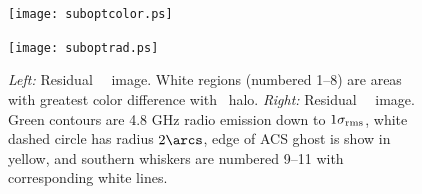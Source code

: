 \begin{figure}
  \begin{center}
    \begin{minipage}{0.495\linewidth}
      \texttt{[image: suboptcolor.ps]}
    \end{minipage}
    \begin{minipage}{0.495\linewidth}
      \texttt{[image: suboptrad.ps]}
    \end{minipage}
    \caption{{\it{Left:}} Residual \hst\ \myv\ image. White regions
      (numbered 1--8) are areas with greatest color difference with
      \rbs\ halo. {\it{Right:}} Residual \hst\ \myi\ image. Green
      contours are 4.8 GHz radio emission down to
      $1\sigma_{\rm{rms}}$, white dashed circle has radius $2\arcs$,
      edge of ACS ghost is show in yellow, and southern whiskers are
      numbered 9--11 with corresponding white lines.}
    \label{fig:subopt}
  \end{center}
\end{figure}
